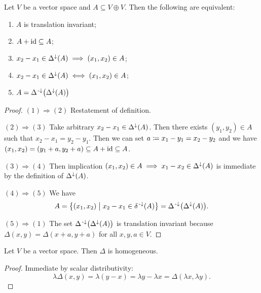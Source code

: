 \begin{lemma} \label{vectorspaceTranslationInvariantSubset}
Let $V$ be a vector space and $A\subseteq V\oplus V$. Then the following are equivalent:
\begin{enumerate}
\item $A$ is translation invariant;
\item $A+\operatorname{id} \subseteq A$;
\item $x_2 - x_1\in \Delta^\downarrow(A) \implies (x_1, x_2)\in A$;
\item $x_2 - x_1\in \Delta^\downarrow(A) \iff (x_1, x_2)\in A$;
\item $A = \Delta^{{\text{\hspace{0.15em}-}\downarrow}}\big(\Delta^\downarrow(A)\big)$
\end{enumerate}
\end{lemma}
\begin{proof}
$\boxed{(1) \Rightarrow (2)}$ Restatement of definition.

$\boxed{(2) \Rightarrow (3)}$ Take arbitrary $x_2 - x_1\in \Delta^\downarrow(A)$. Then there exists $(y_1,y_2)\in A$ such that $x_2 - x_1 = y_2 - y_1$. Then we can set $a \coloneqq x_1 - y_1 = x_2 - y_2$ and we have $(x_1, x_2) = (y_1 + a, y_2 + a) \subseteq A+\operatorname{id} \subseteq A$.

$\boxed{(3) \Rightarrow (4)}$ Then implication $(x_1, x_2)\in A \implies x_1 - x_2\in \Delta^\downarrow(A)$ is immediate by the definition of $\Delta^\downarrow(A)$.

$\boxed{(4) \Rightarrow (5)}$ We have
\[ A = \setbuilder{(x_1, x_2)}{x_2-x_1 \in \delta^{\preimf}(A)} = \Delta^\preimf\big(\Delta^\imf(A)\big). \]

$\boxed{(5) \Rightarrow (1)}$ The set $\Delta^{{\text{\hspace{0.15em}-}\downarrow}}\big(\Delta^\downarrow(A)\big)$ is translation invariant because $\Delta(x,y) = \Delta(x+a,y+a)$ for all $x,y,a\in V$.
\end{proof}

\begin{lemma}
Let $V$ be a vector space. Then $\Delta$ is homogeneous.
\end{lemma}
\begin{proof}
Immediate by scalar distributivity:
\[ \lambda\Delta(x,y) = \lambda(y-x) = \lambda y - \lambda x = \Delta(\lambda x, \lambda y). \]
\end{proof}

